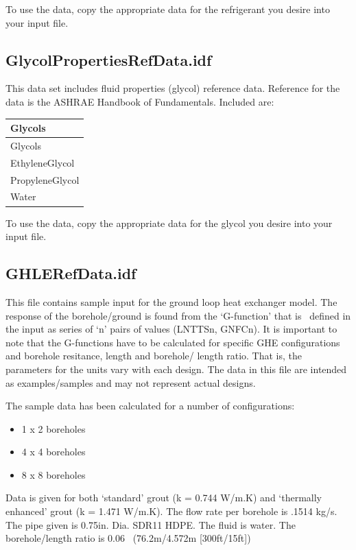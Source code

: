 To use the data, copy the appropriate data for the refrigerant you desire into your input file.

\subsection{GlycolPropertiesRefData.idf}\label{glycolpropertiesrefdata.idf}

This data set includes fluid properties (glycol) reference data. Reference for the data is the ASHRAE Handbook of Fundamentals. Included are:

\begin{longtable}[c]{@{}l@{}}
\toprule 
Glycols \tabularnewline
\midrule
\endfirsthead

\toprule 
Glycols \tabularnewline
\midrule
\endhead

EthyleneGlycol \tabularnewline
PropyleneGlycol \tabularnewline
Water \tabularnewline
\bottomrule
\end{longtable}

To use the data, copy the appropriate data for the glycol you desire into your input file.

\subsection{GHLERefData.idf}\label{ghlerefdata.idf}

This file contains sample input for the ground loop heat exchanger model. The response of the borehole/ground is found from the `G-function' that is~ defined in the input as series of `n' pairs of values (LNTTSn, GNFCn). It is important to note that the G-functions have to be calculated for specific GHE configurations and borehole resitance, length and borehole/ length ratio. That is, the parameters for the units vary with each design. The data in this file are intended as examples/samples and may not represent actual designs.

The sample data has been calculated for a number of configurations:

\begin{itemize}
\tightlist
\item
  1 x 2 boreholes
\item
  4 x 4 boreholes
\item
  8 x 8 boreholes
\end{itemize}

Data is given for both `standard' grout (k = 0.744 W/m.K) and `thermally enhanced' grout (k = 1.471 W/m.K). The flow rate per borehole is .1514 kg/s. The pipe given is 0.75in. Dia. SDR11 HDPE. The fluid is water. The borehole/length ratio is 0.06~ (76.2m/4.572m {[}300ft/15ft{]})

